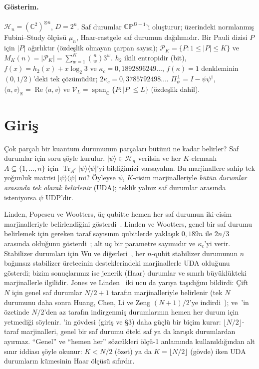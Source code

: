 \documentclass[aps,pra,onecolumn,superscriptaddress,nofootinbib,longbibliography,10pt]{revtex4-2}
\theoremstyle{definition}
\newcommand{\CC}{\mathbb C}
\newcommand{\RR}{\mathbb R}
\newcommand{\CP}{\mathbb{CP}}
\newcommand{\Tr}{\operatorname{Tr}}
\newcommand{\spanC}{\operatorname{span}_{\CC}}
\newcommand{\Pperp}{\Pi^{\perp}_{\psi}}
\newcommand{\kc}{\kappa_c}
\begin{document}
\paragraph*{Gösterim.} $\mathcal H_n=(\CC^2)^{\otimes n}$, $D=2^n$. Saf durumlar $\CP^{D-1}$'i oluşturur; üzerindeki normlanmış Fubini--Study ölçüsü $\mu_n$, Haar-rastgele saf durumun dağılımıdır. Bir Pauli dizisi $P$ için $|P|$ ağırlıktır (özdeşlik olmayan çarpan sayısı); $\mathcal P_K=\{P:1\le|P|\le K\}$ ve $M_K(n)=|\mathcal P_K|=\sum_{w=1}^{K}\binom nw 3^w$. $h_2$ ikili entropidir (bit), $f(x)=h_2(x)+x\log_2 3$ ve $\kc=0{,}1892896249\ldots$, $f(\kappa)=1$ denkleminin $(0, 1/2)$'deki tek çözümüdür; $2\kc=0{,}3785792498\ldots$. $\Pperp=I-\psi\psi^\dagger$, $\langle u,v\rangle_{\RR}=\operatorname{Re}\langle u,v\rangle$ ve $\mathcal V_L=\spanC\{P:|P|\le L\}$ (özdeşlik dahil).

\section{Giriş}

Çok parçalı bir kuantum durumunun parçaları bütünü ne kadar belirler? Saf durumlar için soru şöyle kurulur. $|\psi\rangle\in\mathcal H_n$ verilsin ve her $K$-elemanlı $A\subseteq\{1,\dots,n\}$ için $\Tr_{A^c}|\psi\rangle\langle\psi|$'yi bildiğimizi varsayalım. Bu marjinallere sahip tek yoğunluk matrisi $|\psi\rangle\langle\psi|$ mi? Öyleyse $\psi$, $K$-cisim marjinalleriyle \emph{bütün durumlar arasında tek olarak belirlenir} (UDA); teklik yalnız saf durumlar arasında isteniyorsa $\psi$ UDP'dir.

Linden, Popescu ve Wootters, üç qubitte hemen her saf durumun iki-cisim marjinalleriyle belirlendiğini gösterdi~\cite{LPW02}. Linden ve Wootters, genel bir saf durumu belirlemek için gereken taraf sayısının qubitlerde yaklaşık $0{,}189n$ ile $2n/3$ arasında olduğunu gösterdi~\cite{LW02}; alt uç bir parametre sayımıdır ve $\kc$'yi verir. Stabilizer durumları için Wu ve diğerleri~\cite{Wu15}, her $n$-qubit stabilizer durumunun $n$ bağımsız stabilizer üretecinin desteklerindeki marjinallerle UDA olduğunu gösterdi; bizim sonuçlarımız ise jenerik (Haar) durumlar ve sınırlı büyüklükteki marjinallerle ilgilidir. Jones ve Linden~\cite{JL05} iki ucu da yarıya taşıdığını bildirdi: Çift $N$ için genel saf durumlar $N/2+1$ tarafın marjinalleriyle belirlenir (tek $N$ durumunu daha sonra Huang, Chen, Li ve Zeng $(N+1)/2$'ye indirdi~\cite{HCLZ18}); ve~\cite{JL05}'in özetinde $N/2$'den az tarafın indirgenmiş durumlarının hemen her durum için yetmediği söylenir. \cite{JL05}'in gövdesi (giriş ve §3) daha güçlü bir biçim kurar: $\lfloor N/2\rfloor$-taraf marjinalleri, genel bir saf durumu öteki saf ya da karışık durumlardan ayırmaz. ``Genel'' ve ``hemen her'' sözcükleri ölçü-1 anlamında kullanıldığından alt sınır iddiası şöyle okunur: $K<N/2$ (özet) ya da $K=\lfloor N/2\rfloor$ (gövde) iken UDA durumların kümesinin Haar ölçüsü sıfırdır.
\end{document}
